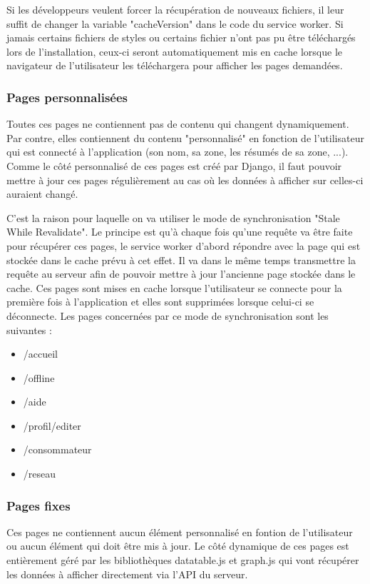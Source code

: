 \documentclass{EPL-master-thesis-covers-FR}
\begin{document}
					Si les développeurs veulent forcer la récupération de nouveaux fichiers, il leur suffit de changer la variable "cacheVersion" dans le code du service worker. Si jamais certains fichiers de styles ou certains fichier n'ont pas pu être téléchargés lors de l'installation, ceux-ci seront automatiquement mis en cache lorsque le navigateur de l'utilisateur les téléchargera pour afficher les pages demandées.
					
					
				\subsubsection*{Pages personnalisées}				
				 	Toutes ces pages ne contiennent pas de contenu qui changent dynamiquement. Par contre, elles contiennent du contenu "personnalisé" en fonction de l'utilisateur qui est connecté à l'application (son nom, sa zone, les résumés de sa zone, ...). Comme le côté personnalisé de ces pages est créé par Django, il faut pouvoir mettre à jour ces pages régulièrement au cas où les données à afficher sur celles-ci auraient changé. 
				 	
				 	C'est la raison pour laquelle on va utiliser le mode de synchronisation "Stale While Revalidate". Le principe est qu'à chaque fois qu'une requête va être faite pour récupérer ces pages, le service worker d'abord répondre avec la page qui est stockée dans le cache prévu à cet effet. Il va dans le même temps transmettre la requête au serveur afin de pouvoir mettre à jour l'ancienne page stockée dans le cache. Ces pages sont mises en cache lorsque l'utilisateur se connecte pour la première fois à l'application et elles sont supprimées lorsque celui-ci se déconnecte. Les pages concernées par ce mode de synchronisation sont les suivantes :
				 	\begin{itemize}
				 		\item /accueil
				 		\item /offline
				 		\item /aide
				 		\item /profil/editer
				 		\item /consommateur
				 		\item /reseau
				 	\end{itemize}
				 	
				\subsubsection*{Pages fixes} 
					Ces pages ne contiennent aucun élément personnalisé en fontion de l'utilisateur ou aucun élément qui doit être mis à jour. Le côté dynamique de ces pages est entièrement géré par les bibliothèques datatable.js et graph.js qui vont récupérer les données à afficher directement via l'API du serveur. 
				
\end{document}

